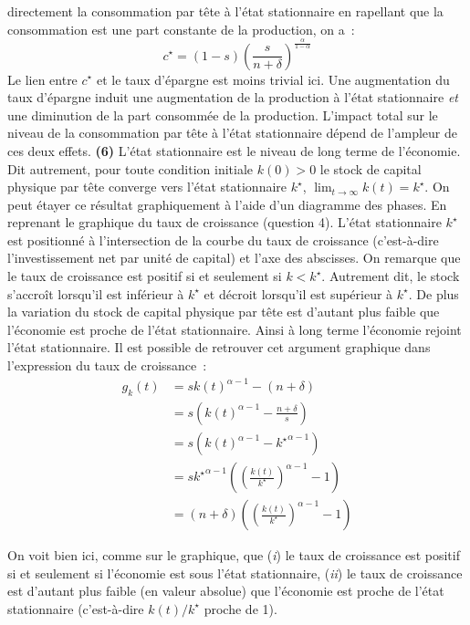 \documentclass[10pt,a4paper,notitlepage,twocolumn]{article}
\newcommand{\question}[1]{\textbf{(#1)}}
\begin{document}
directement la consommation par tête à l'état stationnaire en
rapellant que la consommation est une part constante de la production,
on a :
\[
c^{\star} = (1-s)\left(\frac{s}{n+\delta}\right)^{\frac{\alpha}{1-\alpha}}
\]
Le lien entre $c^{\star}$ et le taux d'épargne est moins trivial ici.
Une augmentation du taux d'épargne induit une augmentation de la
production à l'état stationnaire \emph{et} une diminution de la part
consommée de la production. L'impact total sur le niveau de la
consommation par tête à l'état stationnaire dépend de l'ampleur de ces
deux effets. \question{6} L'état stationnaire est le niveau de long
terme de l'économie. Dit autrement, pour toute condition initiale
$k(0)>0$ le stock de capital physique par tête converge vers l'état
stationnaire $k^{\star}$,
$\lim_{t\rightarrow\infty}k(t)=k^{\star}$. On peut étayer ce résultat
graphiquement à l'aide d'un diagramme des phases. En reprenant le
graphique du taux de croissance (question 4). L'état stationnaire
$k^{\star}$ est positionné à l'intersection de la courbe du taux de
croissance (c'est-à-dire l'investissement net par unité de capital) et
l'axe des abscisses. On remarque que le taux de croissance est positif
si et seulement si $k<k^{\star}$. Autrement dit, le stock s'accroît
lorsqu'il est inférieur à $k^{\star}$ et décroit lorsqu'il est
supérieur à $k^{\star}$. De plus la variation du stock de capital
physique par tête est d'autant plus faible que l'économie est proche
de l'état stationnaire. Ainsi à long terme l'économie rejoint l'état
stationnaire. Il est possible de retrouver cet argument graphique dans
l'expression du taux de croissance :
\[
  \begin{split}
    g_{k}(t) &= s k(t)^{\alpha-1} - (n+\delta)\\
    &= s \left(k(t)^{\alpha-1} - \frac{n+\delta}{s}\right)\\
    &= s \left(k(t)^{\alpha-1} - \left. k^{\star}\right.^{\alpha-1}\right)\\
    &= s \left. k^{\star}\right.^{\alpha-1} \left( \left(\frac{k(t)}{k^{\star}}\right)^{\alpha-1} - 1\right)\\
    &= (n+\delta)\left( \left(\frac{k(t)}{k^{\star}}\right)^{\alpha-1} - 1\right)
  \end{split}
\]

On voit bien ici, comme sur le graphique, que (\textit{i}) le taux de croissance est positif si
et seulement si l'économie est sous l'état stationnaire, (\textit{ii})
le taux de croissance est d'autant plus faible (en valeur absolue) que
l'économie est proche de l'état stationnaire (c'est-à-dire
$k(t)/k^{\star}$ proche de 1).
\end{document}
